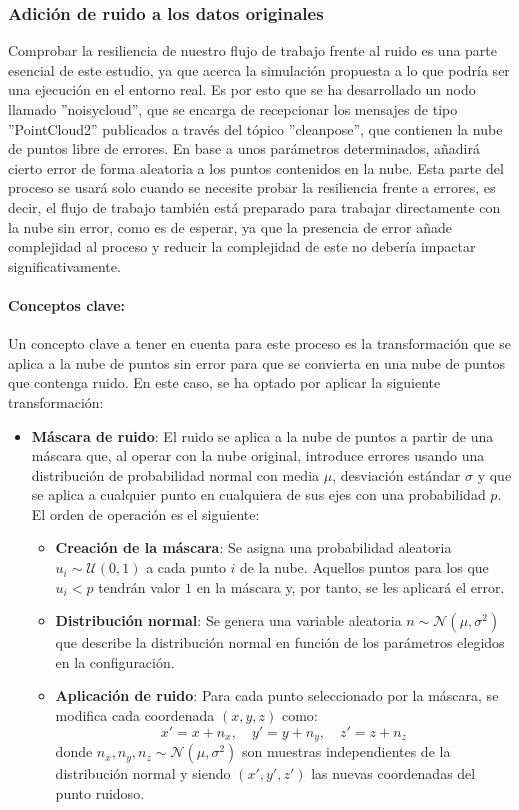 \documentclass[12pt, a4paper, twoside]{article}
\begin{document}
\subsubsection{Adición de ruido a los datos originales}
Comprobar la resiliencia de nuestro flujo de trabajo frente al ruido es una parte esencial de este estudio, ya que acerca la simulación propuesta 
a lo que podría ser una ejecución en el entorno real. Es por esto que se ha desarrollado un nodo llamado ''noisy\textunderscore cloud'', que se encarga de recepcionar 
los mensajes de tipo ''PointCloud2'' publicados a través del tópico ''clean\textunderscore pose'', que contienen la nube de puntos libre de errores. En base a unos 
parámetros determinados, añadirá cierto error de forma aleatoria a los puntos contenidos en la nube. Esta parte del proceso se usará solo cuando se necesite probar la 
resiliencia frente a errores, es decir, el flujo de trabajo también está preparado para trabajar directamente con la nube sin error, como es de esperar, ya que la 
presencia de error añade complejidad al proceso y reducir la complejidad de este no debería impactar significativamente.

\paragraph{Conceptos clave:} 
Un concepto clave a tener en cuenta para este proceso es la transformación que se aplica a la nube de puntos sin error para que se convierta en una nube de 
puntos que contenga ruido. En este caso, se ha optado por aplicar la siguiente transformación:
\begin{itemize}
  \item \textbf{Máscara de ruido}: El ruido se aplica a la nube de puntos a partir de una máscara que, al operar con la nube original, introduce errores 
  usando una distribución de probabilidad normal con media $\mu$, desviación estándar $\sigma$ y que se aplica a cualquier punto en cualquiera de sus ejes 
  con una probabilidad $p$. El orden de operación es el siguiente:
  \begin{itemize}
      \item \textbf{Creación de la máscara}: Se asigna una probabilidad aleatoria $u_i \sim \mathcal{U}(0,1)$ a cada punto $i$ de la nube.  
      Aquellos puntos para los que $u_i < p$ tendrán valor $1$ en la máscara y, por tanto, se les aplicará el error.
      
      \item \textbf{Distribución normal}: Se genera una variable aleatoria $n \sim \mathcal{N}(\mu, \sigma^2)$ que describe la distribución normal en 
      función de los parámetros elegidos en la configuración.
      
      \item \textbf{Aplicación de ruido}: Para cada punto seleccionado por la máscara, se modifica cada coordenada $(x, y, z)$ como:
      \[
      x' = x + n_x, \quad y' = y + n_y, \quad z' = z + n_z
      \]
      donde $n_x, n_y, n_z \sim \mathcal{N}(\mu, \sigma^2)$ son muestras independientes de la distribución normal y siendo $(x',y',z')$ las nuevas coordenadas del punto ruidoso.
  \end{itemize}
\end{itemize}
\end{document}
